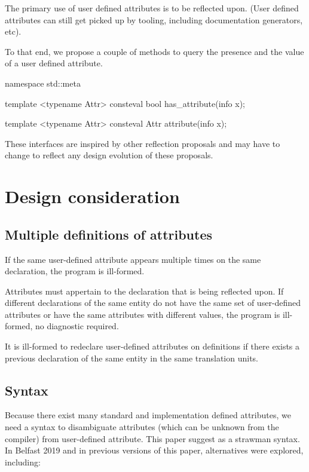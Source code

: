 \documentclass{wg21}
\begin{document}
The primary use of user defined attributes is to be reflected upon.
(User defined attributes can still get picked up by tooling, including documentation generators, etc).

To that end, we propose a couple of methods to query the presence and the value of a user defined attribute.

\begin{colorblock}
namespace std::meta {
    template <typename Attr>
    consteval bool has_attribute(info x);
    
    template <typename Attr>
    consteval Attr attribute(info x);
}

\end{colorblock}

\begin{note}
These interfaces are inspired by other reflection proposals and may have to change to reflect any design evolution of these proposals.
\end{note}


\section{Design consideration}

\subsection{Multiple definitions of attributes}

If the same user-defined attribute appears multiple times on the same declaration, the program is ill-formed.

Attributes must appertain to the declaration that is being reflected upon.
If different declarations of the same entity do not have the same set of user-defined attributes or have the same attributes with different values, the program is ill-formed, no diagnostic required.

It is ill-formed to redeclare user-defined attributes on definitions if there exists a previous declaration of the same entity
in the same translation units.

\subsection{Syntax}

Because there exist many standard and implementation defined attributes, we need a syntax to disambiguate attributes (which can be unknown from the compiler)
from user-defined attribute.
This paper suggest  as a strawman syntax.
In Belfast 2019 and in previous versions of this paper, alternatives were explored, including:
\end{document}
